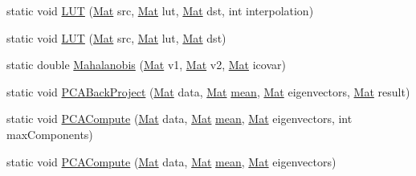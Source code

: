 \begin{DoxyCompactItemize}
\item 
static void \mbox{\hyperlink{classorg_1_1opencv_1_1core_1_1_core_a51b34caa90fa1c30524b3cb852d840d6}{L\+UT}} (\mbox{\hyperlink{classorg_1_1opencv_1_1core_1_1_mat}{Mat}} src, \mbox{\hyperlink{classorg_1_1opencv_1_1core_1_1_mat}{Mat}} lut, \mbox{\hyperlink{classorg_1_1opencv_1_1core_1_1_mat}{Mat}} dst, int interpolation)
\item 
static void \mbox{\hyperlink{classorg_1_1opencv_1_1core_1_1_core_a8536482ca714c4dc25fff4c48ae64bca}{L\+UT}} (\mbox{\hyperlink{classorg_1_1opencv_1_1core_1_1_mat}{Mat}} src, \mbox{\hyperlink{classorg_1_1opencv_1_1core_1_1_mat}{Mat}} lut, \mbox{\hyperlink{classorg_1_1opencv_1_1core_1_1_mat}{Mat}} dst)
\item 
static double \mbox{\hyperlink{classorg_1_1opencv_1_1core_1_1_core_ae6da41381cc2fc87daa1a14a2c476781}{Mahalanobis}} (\mbox{\hyperlink{classorg_1_1opencv_1_1core_1_1_mat}{Mat}} v1, \mbox{\hyperlink{classorg_1_1opencv_1_1core_1_1_mat}{Mat}} v2, \mbox{\hyperlink{classorg_1_1opencv_1_1core_1_1_mat}{Mat}} icovar)
\item 
static void \mbox{\hyperlink{classorg_1_1opencv_1_1core_1_1_core_a3b8b2b268d857381ddc7bba20b464d1f}{P\+C\+A\+Back\+Project}} (\mbox{\hyperlink{classorg_1_1opencv_1_1core_1_1_mat}{Mat}} data, \mbox{\hyperlink{classorg_1_1opencv_1_1core_1_1_mat}{Mat}} \mbox{\hyperlink{classorg_1_1opencv_1_1core_1_1_core_aff700e66b1cef1a74cfd94d405369edf}{mean}}, \mbox{\hyperlink{classorg_1_1opencv_1_1core_1_1_mat}{Mat}} eigenvectors, \mbox{\hyperlink{classorg_1_1opencv_1_1core_1_1_mat}{Mat}} result)
\item 
static void \mbox{\hyperlink{classorg_1_1opencv_1_1core_1_1_core_aab65f922f93f6aad0b5d10ba2f27f401}{P\+C\+A\+Compute}} (\mbox{\hyperlink{classorg_1_1opencv_1_1core_1_1_mat}{Mat}} data, \mbox{\hyperlink{classorg_1_1opencv_1_1core_1_1_mat}{Mat}} \mbox{\hyperlink{classorg_1_1opencv_1_1core_1_1_core_aff700e66b1cef1a74cfd94d405369edf}{mean}}, \mbox{\hyperlink{classorg_1_1opencv_1_1core_1_1_mat}{Mat}} eigenvectors, int max\+Components)
\item 
static void \mbox{\hyperlink{classorg_1_1opencv_1_1core_1_1_core_aa77b57fe39b738ce2260e77c84405e73}{P\+C\+A\+Compute}} (\mbox{\hyperlink{classorg_1_1opencv_1_1core_1_1_mat}{Mat}} data, \mbox{\hyperlink{classorg_1_1opencv_1_1core_1_1_mat}{Mat}} \mbox{\hyperlink{classorg_1_1opencv_1_1core_1_1_core_aff700e66b1cef1a74cfd94d405369edf}{mean}}, \mbox{\hyperlink{classorg_1_1opencv_1_1core_1_1_mat}{Mat}} eigenvectors)

\end{DoxyCompactItemize}
